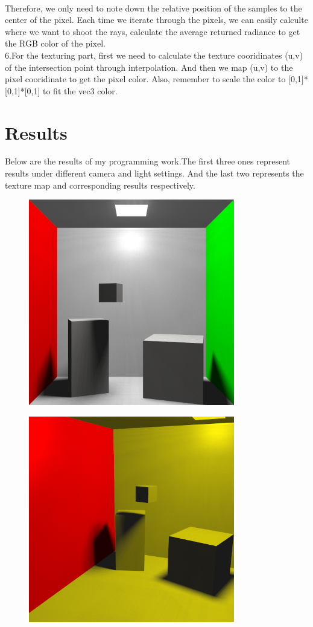 \documentclass[acmtog]{acmart}
\begin{document}
\\\indent Therefore, we only need to note down the relative position of the samples to the center of the pixel. Each time we iterate through the pixels, we can easily calculte where we want to shoot the rays, calculate the average returned radiance to get the RGB color of the pixel.
\\\indent 6.For the texturing part, first we need to calculate the texture cooridinates (u,v) of the intersection point through interpolation. And then we map (u,v) to the pixel cooridinate to get the pixel color. Also, remember to scale the color to [0,1]*[0,1]*[0,1] to fit the vec3 color.
\section{Results}
\qquad Below are the results of my programming work.The first three ones represent results under different camera and light settings. And the last two represents the texture map and corresponding results respectively.
\begin{figure}[h]
	\centering
	\includegraphics[width=9cm,height=9cm]{output.png}
\end{figure}
\begin{figure}[h]
	\centering
	\includegraphics[width=9cm,height=9cm]{output1.png}
\end{figure}
\end{document}
